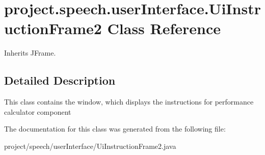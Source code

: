 \section{project.\+speech.\+user\+Interface.\+Ui\+Instruction\+Frame2 Class Reference}
\label{classproject_1_1speech_1_1user_interface_1_1_ui_instruction_frame2}


Inherits J\+Frame.



\subsection{Detailed Description}
This class contains the window, which displays the instructions for performance calculator component 

The documentation for this class was generated from the following file\+:\begin{DoxyCompactItemize}
\item 
project/speech/user\+Interface/Ui\+Instruction\+Frame2.\+java\end{DoxyCompactItemize}
